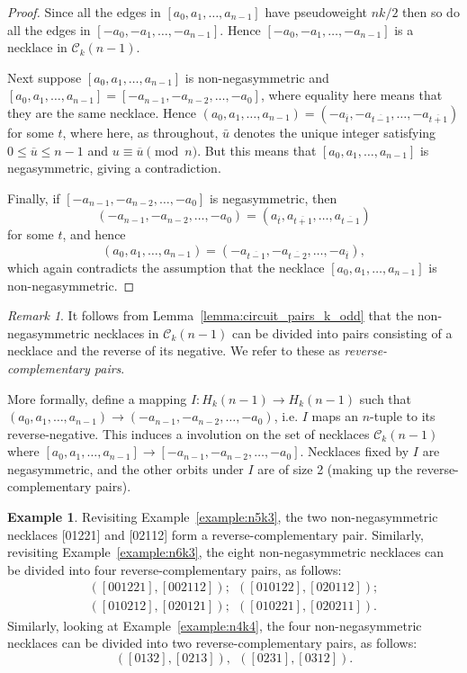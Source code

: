 \documentclass[a4paper,11pt]{article}
\theoremstyle{plain}
\theoremstyle{definition}
\newtheorem{example}{Example}[section]
\theoremstyle{remark}
\newtheorem{remark}{Remark}[section]
\begin{document}
\begin{proof}
Since all the edges in $[a_0,a_1,\dots,a_{n-1}]$ have pseudoweight $nk/2$ then so do all the edges
in $[-a_0,-a_1,\dots,-a_{n-1}]$.  Hence $[-a_0,-a_1,\dots,-a_{n-1}]$ is a necklace in
$\mathcal{C}_k(n-1)$.

Next suppose $[a_0,a_1,\dots,a_{n-1}]$ is non-negasymmetric and
$[a_0,a_1,\dots,a_{n-1}]=[-a_{n-1},-a_{n-2},\dots,-a_{0}]$, where equality here means that they are
the same necklace.  Hence
$(a_0,a_1,\dots,a_{n-1})=(-a_{\overline{t}},-a_{\overline{t-1}},\dots,-a_{\overline{t+1}})$ for
some $t$, where here, as throughout, $\bar{u}$ denotes the unique integer satisfying $0\leq
\overline{u}\leq n-1$ and $u\equiv\overline{u}\pmod n$. But this means that
$[a_0,a_1,\dots,a_{n-1}]$ is negasymmetric, giving a contradiction.

Finally, if $[-a_{n-1},-a_{n-2},\dots,-a_{0}]$ is negasymmetric, then
\[ (-a_{n-1},-a_{n-2},\dots,-a_{0})=(a_{\overline{t}},a_{\overline{t+1}},\dots,a_{\overline{t-1}}) \]
for some $t$, and hence
\[ (a_{0},a_{1},\dots,a_{n-1})=(-a_{\overline{t-1}},-a_{\overline{t-2}},\dots,-a_{\overline{t}}),
\]
which again contradicts the assumption that the necklace $[a_0,a_1,\dots,a_{n-1}]$ is
non-negasymmetric.
\end{proof}

\begin{remark}
It follows from Lemma~\ref{lemma:circuit_pairs_k_odd} that the non-negasymmetric necklaces in
$\mathcal{C}_k(n-1)$ can be divided into pairs consisting of a necklace and the reverse of its
negative.  We refer to these as \emph{reverse-complementary pairs}.

More formally, define a mapping $I: H_k(n-1)\rightarrow H_k(n-1)$ such that
$(a_0,a_1,\dots,a_{n-1})\rightarrow(-a_{n-1},-a_{n-2},\dots,-a_{0})$, i.e. $I$ maps an $n$-tuple to
its reverse-negative. This induces a involution on the set of necklaces $\mathcal{C}_k(n-1)$ where
$[a_0,a_1,\dots,a_{n-1}]\rightarrow[-a_{n-1},-a_{n-2},\dots,-a_{0}]$. Necklaces fixed by $I$ are
negasymmetric, and the other orbits under $I$ are of size 2 (making up the reverse-complementary
pairs).
\end{remark}

\begin{example}  \label{example:revisit}
Revisiting Example~\ref{example:n5k3}, the two non-negasymmetric necklaces [01221] and [02112] form
a reverse-complementary pair.  Similarly, revisiting Example~\ref{example:n6k3}, the eight
non-negasymmetric necklaces can be divided into four reverse-complementary pairs, as follows:
\[
\begin{split}
([001221], [002112]);~~ ([010122], [020112]);\\
([010212], [020121]);~~ ([010221], [020211]).
\end{split}
\]
Similarly, looking at Example~\ref{example:n4k4}, the four non-negasymmetric necklaces can be
divided into two reverse-complementary pairs, as follows:
\[ ([0132], [0213]),~~([0231],[0312]). \]

\end{example}
\end{document}
